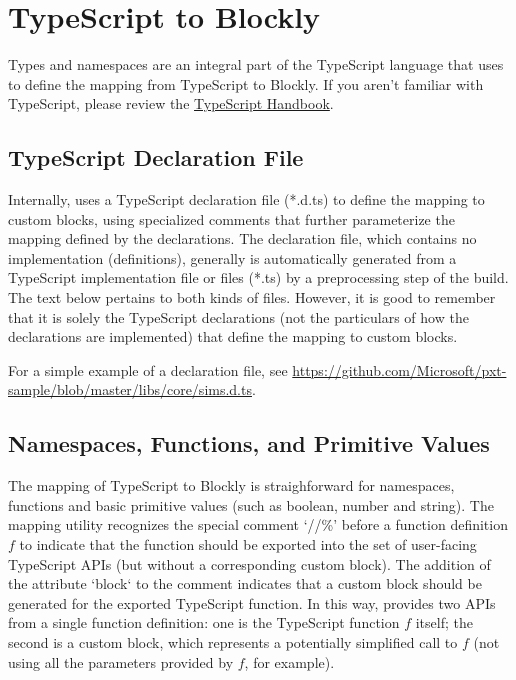 

\section{TypeScript to Blockly}

Types and namespaces are an integral part of the TypeScript language that
\MC uses to define the mapping from TypeScript to Blockly. If you aren't
familiar with TypeScript, please review the 
\href{https://www.typescriptlang.org/docs/handbook/basic-types.html}{TypeScript Handbook}.

\subsection{TypeScript Declaration File}

Internally, 
\MC uses a TypeScript declaration file (*.d.ts) to define
the mapping to custom blocks,
using specialized comments that further parameterize the mapping
defined by the declarations.  
The declaration file, which contains no implementation (definitions),
generally is automatically generated from a TypeScript implementation
file or files (*.ts) by a preprocessing step of the \MC build. 
The text below pertains to both kinds of files.  However, it is good to remember
that it is solely the TypeScript declarations (not the particulars of how
the declarations are implemented) that define the mapping to custom blocks. 

For a simple example of a declaration file, see
\url{https://github.com/Microsoft/pxt-sample/blob/master/libs/core/sims.d.ts}.


\subsection{Namespaces, Functions, and Primitive Values}

The mapping of TypeScript to Blockly is straighforward for namespaces,
functions and basic primitive values (such as boolean, number and string).
The mapping utility recognizes the special comment `//\%' before a function
definition $f$ to indicate that the function should be exported into the 
set of user-facing TypeScript APIs (but without a corresponding custom block). The
addition of the attribute `block` to the comment indicates that a custom
block should be generated for the exported TypeScript function.  In this way, 
\MC provides two APIs from a single function definition: one is the
TypeScript function $f$ itself; the second is a custom block, which represents
a potentially simplified call to $f$ (not using all the parameters provided by
$f$, for example).

